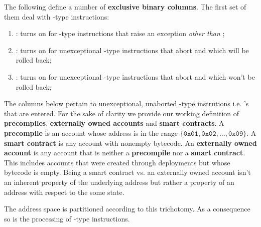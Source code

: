 The following define a number of \textbf{exclusive binary columns}.
The first set of them deal with -type instructions:
\begin{enumerate}
	\item \scenCallException:
		turns on for -type instructions that raise an exception \emph{other than} \suxSH{};
	\item \scenCallAbortWillRevert:
		turns on for unexceptional -type instructions that abort and which will be rolled back;
	\item \scenCallAbortWontRevert:
		turns on for unexceptional -type instructions that abort and which won't be rolled back;
\end{enumerate}
The columns below pertain to unexceptional, unaborted -type instrutions i.e. 's that are entered. 
For the sake of clarity we provide our working definition of \textbf{precompiles}, \textbf{externally owned accounts} and \textbf{smart contracts}.
A \textbf{precompile} is an account whose address is in the range $\{\texttt{0x01},\texttt{0x02},\dots, \texttt{0x09}\}$.
A \textbf{smart contract} is any account with nonempty bytecode.
An \textbf{externally owned account} is any account that is neither a \textbf{precompile} nor a \textbf{smart contract}. 
This includes accounts that were created through deployments but whose bytecode is empty.
Being a smart contract vs. an externally owned account isn't an inherent property of the underlying address but rather a property of an address with respect to the some state. 

\saNote{} The address space is partitioned according to this trichotomy. As a consequence so is the processing of -type instructions.

